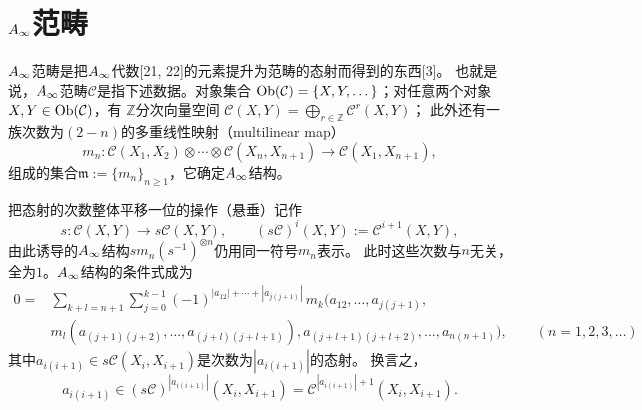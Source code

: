 
\section{\texorpdfstring{$A_{\infty}$范畴}{A∞ 范畴}}
\label{sec:c01}

$A_{\infty}$范畴是把$A_{\infty}$代数[21, 22]的元素提升为范畴的态射而得到的东西[3]。
也就是说，$A_{\infty}$范畴$\mathcal{C}$是指下述数据。对象集合
$\operatorname{Ob}(\mathcal{C})=\{X,Y,\dots\}$；对任意两个对象$X,Y\in\operatorname{Ob}(\mathcal{C})$，有
$\mathbb{Z}$分次向量空间
$\mathcal{C}(X,Y)=\bigoplus_{r\in\mathbb{Z}}\mathcal{C}^{r}(X,Y)$；
此外还有一族次数为$(2-n)$的多重线性映射（multilinear map）
\[
  m_{n}:\mathcal{C}(X_{1},X_{2})\otimes\cdots\otimes\mathcal{C}(X_{n},X_{n+1})
  \longrightarrow\mathcal{C}(X_{1},X_{n+1}),
\]
组成的集合$\mathfrak{m}:=\{m_{n}\}_{n\ge 1}$，它确定$A_{\infty}$结构。

把态射的次数整体平移一位的操作（悬垂）记作
\[
  s:\mathcal{C}(X,Y)\longrightarrow s\mathcal{C}(X,Y),\qquad
  (s\mathcal{C})^{i}(X,Y):=\mathcal{C}^{i+1}(X,Y),
\]
由此诱导的$A_{\infty}$结构$sm_{n}(s^{-1})^{\otimes n}$仍用同一符号$m_{n}$表示。
此时这些次数与$n$无关，全为$1$。$A_{\infty}$结构的条件式成为
\begin{equation}
\begin{aligned}
  0={}&\sum_{k+l=n+1}\sum_{j=0}^{k-1}
  (-1)^{|a_{12}|+\cdots+|a_{j(j+1)}|}\,
  m_{k}\bigl(a_{12},\dots,a_{j(j+1)},\\
  &m_{l}(a_{(j+1)(j+2)},\dots,a_{(j+l)(j+l+1)}),
  a_{(j+l+1)(j+l+2)},\dots,a_{n(n+1)}\bigr),
  \qquad(n=1,2,3,\dots)
\end{aligned}
\label{eq:c01-2}
\end{equation}
其中$a_{i(i+1)}\in s\mathcal{C}(X_{i},X_{i+1})$是次数为$|a_{i(i+1)}|$的态射。
换言之，
\[
  a_{i(i+1)}\in(s\mathcal{C})^{|a_{i(i+1)}|}(X_{i},X_{i+1})
  =\mathcal{C}^{|a_{i(i+1)}|+1}(X_{i},X_{i+1}).
\]


